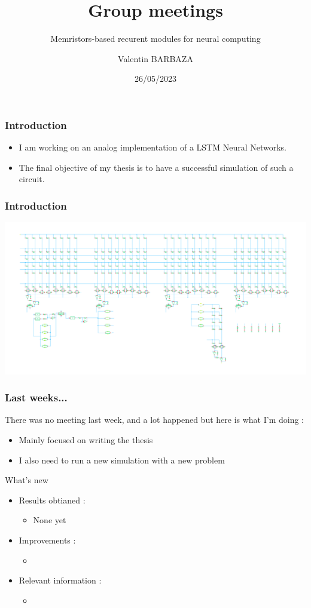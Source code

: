 \documentclass[table]{beamer}
\title{Group meetings}
\subtitle{Memristors-based recurent modules for neural computing}
\author[V. BARBAZA]{Valentin BARBAZA}
\date{26/05/2023}
\begin{document}
  \frame{\titlepage}


  \begin{frame}
    \frametitle{Introduction}

    \begin{itemize}
        \color{text}
      \item I am working on an analog implementation of a LSTM Neural Networks.
      \item The final objective of my thesis is to have a successful simulation of such a circuit.
    \end{itemize}

  \end{frame}

  \begin{frame}
    \frametitle{Introduction}
    \centering\includegraphics[width=\textwidth]{lstm/lstm-np}
  \end{frame}

  \begin{frame}
    \frametitle{Last weeks...}

    There was no meeting last week, and a lot happened but here is what I'm doing :
    \begin{itemize}
      \item Mainly focused on writing the thesis
      \item I also need to run a new simulation with a new problem
    \end{itemize}
  \end{frame}

  \begin{frame}{What's new}
    \begin{itemize}
      \item Results obtianed :
        \begin{itemize}
            \color{text}
          \item None yet
        \end{itemize}
      \item Improvements :
        \begin{itemize}
            \color{text}
          \item
        \end{itemize}
      \item Relevant information :
        \begin{itemize}
            \color{text}
          \item
        \end{itemize}
    \end{itemize}
  \end{frame}
\end{document}
